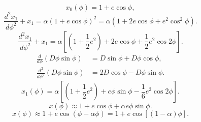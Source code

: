 \documentclass[11pt, a4paper]{report}
\begin{document}
\begin{equation}
\label{eq:x0_solution}
x_{0}(\phi) = 1 + e \cos\phi,
\end{equation}
\begin{equation}
\frac{d^{2}x_{1}}{d\phi^{2}} + x_{1} = \alpha (1 + e \cos\phi)^{2} = \alpha (1 + 2e \cos\phi + e^{2} \cos^{2}\phi).
\end{equation}
\begin{equation}
\frac{d^{2}x_{1}}{d\phi^{2}} + x_{1} = \alpha \left[ \left(1 + \frac{1}{2}e^{2}\right) + 2e \cos\phi + \frac{1}{2}e^{2} \cos 2\phi \right].
\end{equation}
\begin{align}
\frac{d}{d\phi}(D\phi\sin\phi) &= D\sin\phi + D\phi\cos\phi, \\
\frac{d^{2}}{d\phi^{2}}(D\phi\sin\phi) &= 2D\cos\phi - D\phi\sin\phi.
\end{align}
\begin{equation}
x_{1}(\phi) = \alpha \left[ \left(1 + \frac{1}{2}e^{2}\right) + e\phi\sin\phi - \frac{1}{6}e^{2}\cos 2\phi \right].
\end{equation}
\begin{equation}
x(\phi) \approx 1 + e\cos\phi + \alpha e \phi \sin\phi.
\end{equation}
\begin{equation}
\label{eq:precession_phase}
x(\phi) \approx 1 + e \cos(\phi - \alpha\phi) = 1 + e \cos[(1-\alpha)\phi].
\end{equation}
\end{document}
